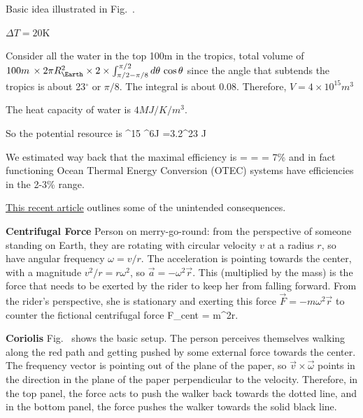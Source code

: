 \documentclass[11pt]{book}
\begin{document}
\bei
\item Basic idea illustrated in Fig.~.
\item $\Delta T=20$K
\item Consider all the water in the top 100m in the tropics, total volume of $100m\,\times 2\pi R_\Earth^2  \times 2\times\int_{\pi/2-\pi/8}^{\pi/2} d\theta\,\cos\theta$ since the angle that subtends the tropics is about 23$^\circ$ or $\pi/8$. The integral is about 0.08. Therefore, $V=4\times 10^{15}m^3$
\item The heat capacity of water is $4 MJ/K/m^3$.
\item So the potential resource is 
^{15} ^6J =3.2^{23} J\ee
\item We estimated way back that the maximal efficiency is 
\be
\eta =  =  = 7\%\ee
and in fact functioning Ocean Thermal Energy Conversion (OTEC) systems have efficiencies in the 2-3\% range.
\item \href{https://www.science.org/doi/10.1126/science.ade7521}{This recent article} outlines some of the unintended consequences.
\eei




\bei
\item {\bf Centrifugal Force} Person on merry-go-round: from the perspective of someone standing on Earth, they are rotating with circular velocity $v$ at a radius $r$, so have angular frequency $\omega=v/r$. The acceleration is pointing towards the center, with a magnitude $v^2/r=r\omega^2$, so $\vec a = - \omega^2\vec r$. This (multiplied by the mass) is the force that needs to be exerted by the rider to keep her from falling forward. From the rider's perspective, she is stationary and exerting this force $\vec F = -m\omega^2 \vec r$ to counter the fictional centrifugal force
\be
\vec F_{cent} = m\omega^2\vec r.\ee
\item {\bf Coriolis} Fig.~ shows the basic setup. The person perceives themselves walking along the red path and getting pushed by some external force towards the center. The frequency vector is pointing out of the plane of the paper, so $\vec v\times\vec\omega$ points in the direction in the plane of the paper perpendicular to the velocity. Therefore, in the top panel, the force acts to push the walker back towards the dotted line, and in the bottom panel, the force pushes the walker towards the solid black line.
\eei
\end{document}
